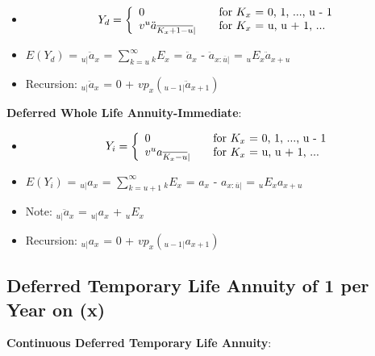 \documentclass[]{book}
\begin{document}
\begin{itemize}
\item
  \[Y_d = \left\{
    \begin{array}{l l}
      0                       & \quad \text{for $K_x$ = 0, 1, ..., u - 1}\\
      v^u \ddot{a}_{\overline{K_x + 1 - u}|}             & \quad \text{for $K_x$ = u, u + 1, ...}\\
    \end{array} \right.\]
\item
  \(E(Y_d)\) = \({}_{u|}\ddot{a}_x\) =
  \(\sum^{\infty}_{k = u} {}_{k}E_x\) = \(\ddot{a}_x\) -
  \(\ddot{a}_{x:\overline{u}|}\) = \({}_{u}E_x\)\(\ddot{a}_{x + u}\)
\item
  Recursion: \({}_{u|}\ddot{a}_x\) = 0 +
  \(vp_x({}_{u - 1|}\ddot{a}_{x + 1})\)
\end{itemize}

\textbf{Deferred Whole Life Annuity-Immediate}:

\begin{itemize}
\item
  \[Y_i = \left\{
    \begin{array}{l l}
      0                       & \quad \text{for $K_x$ = 0, 1, ..., u - 1}\\
      v^u a_{\overline{K_x - u}|}             & \quad \text{for $K_x$ = u, u + 1, ...}\\
    \end{array} \right.\]
\item
  \(E(Y_i)\) = \({}_{u|}a_x\) = \(\sum^{\infty}_{k = u + 1} {}_{k}E_x\)
  = \(a_x\) - \(a_{x :\overline{u}|}\) = \({}_{u}E_x\)\(a_{x + u}\)
\item
  Note: \({}_{u|}\ddot{a}_x\) = \({}_{u|}a_x\) + \({}_{u}E_x\)
\item
  Recursion: \({}_{u|}a_x\) = 0 + \(vp_x({}_{u - 1|}a_{x + 1})\)
\end{itemize}

\subsection{Deferred Temporary Life Annuity of 1 per Year on
(x)}\label{deferred-temporary-life-annuity-of-1-per-year-on-x}

\textbf{Continuous Deferred Temporary Life Annuity}:
\end{document}

